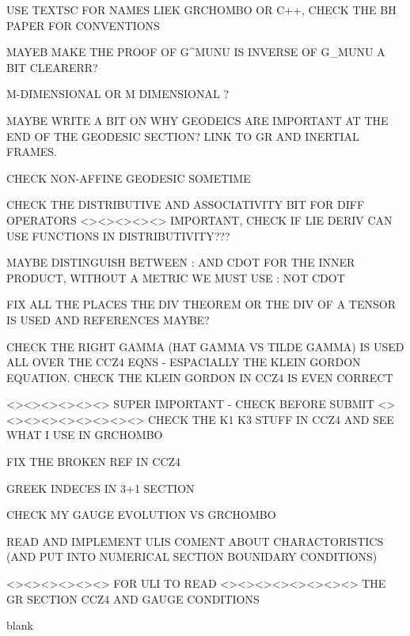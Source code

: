 \documentclass[11pt]{report}  %
\numberwithin{equation}{section}
\begin{document}
USE TEXTSC FOR NAMES LIEK GRCHOMBO OR C++, CHECK THE BH PAPER FOR CONVENTIONS

MAYEB MAKE THE PROOF OF G^MUNU IS INVERSE OF G_MUNU A BIT CLEARERR?

M-DIMENSIONAL OR M DIMENSIONAL ?

MAYBE WRITE A BIT ON WHY GEODEICS ARE IMPORTANT AT THE END OF THE GEODESIC SECTION? LINK TO GR AND INERTIAL FRAMES.

CHECK NON-AFFINE GEODESIC SOMETIME

CHECK THE DISTRIBUTIVE AND ASSOCIATIVITY BIT FOR DIFF OPERATORS <><><><><> IMPORTANT, CHECK IF LIE DERIV CAN USE FUNCTIONS IN DISTRIBUTIVITY???

MAYBE DISTINGUISH BETWEEN : AND CDOT FOR THE INNER PRODUCT, WITHOUT A METRIC WE MUST USE : NOT CDOT

FIX ALL THE PLACES THE DIV THEOREM OR THE DIV OF A TENSOR IS USED AND REFERENCES MAYBE?

CHECK THE RIGHT GAMMA (HAT GAMMA VS TILDE GAMMA) IS USED ALL OVER THE CCZ4 EQNS - ESPACIALLY THE KLEIN GORDON EQUATION. CHECK THE KLEIN GORDON IN CCZ4 IS EVEN CORRECT

<><><><><><> SUPER IMPORTANT - CHECK BEFORE SUBMIT <><><><><><><><><>
CHECK THE K1 K3 STUFF IN CCZ4 AND SEE WHAT I USE IN GRCHOMBO

FIX THE BROKEN REF IN CCZ4

GREEK INDECES IN 3+1 SECTION

CHECK MY GAUGE EVOLUTION VS GRCHOMBO

READ AND IMPLEMENT ULIS COMENT ABOUT CHARACTORISTICS (AND PUT INTO NUMERICAL SECTION BOUNIDARY CONDITIONS)


<><><><><><> FOR ULI TO READ <><><><><><><><>
THE GR SECTION
CCZ4 AND GAUGE CONDITIONS



\begin{thebibliography}{9}

%
%
% 
% 


blank
  \end{thebibliography}



  
\end{document}
